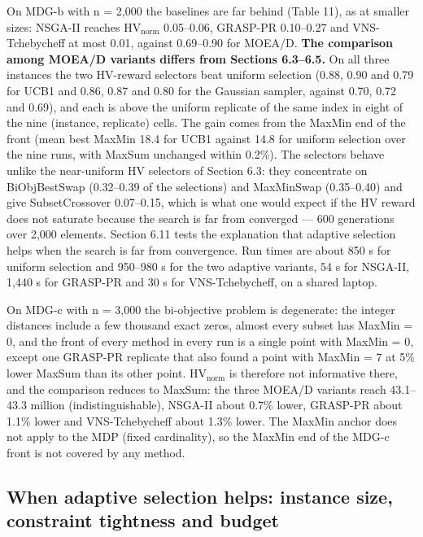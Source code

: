 On MDG-b with n = 2,000 the baselines are far behind (Table 11), as at smaller sizes: NSGA-II reaches $\mathrm{HV}_{\mathrm{norm}}$ 0.05--0.06, GRASP-PR 0.10--0.27 and VNS-Tchebycheff at most 0.01, against 0.69--0.90 for MOEA/D. \textbf{The comparison among MOEA/D variants differs from Sections 6.3--6.5.} On all three instances the two HV-reward selectors beat uniform selection (0.88, 0.90 and 0.79 for UCB1 and 0.86, 0.87 and 0.80 for the Gaussian sampler, against 0.70, 0.72 and 0.69), and each is above the uniform replicate of the same index in eight of the nine (instance, replicate) cells. The gain comes from the MaxMin end of the front (mean best MaxMin 18.4 for UCB1 against 14.8 for uniform selection over the nine runs, with MaxSum unchanged within 0.2\%). The selectors behave unlike the near-uniform HV selectors of Section 6.3: they concentrate on BiObjBestSwap (0.32--0.39 of the selections) and MaxMinSwap (0.35--0.40) and give SubsetCrossover 0.07--0.15, which is what one would expect if the HV reward does not saturate because the search is far from converged --- 600 generations over 2,000 elements. Section 6.11 tests the explanation that adaptive selection helps when the search is far from convergence. Run times are about 850 s for uniform selection and 950--980 s for the two adaptive variants, 54 s for NSGA-II, 1,440 s for GRASP-PR and 30 s for VNS-Tchebycheff, on a shared laptop.

On MDG-c with n = 3,000 the bi-objective problem is degenerate: the integer distances include a few thousand exact zeros, almost every subset has MaxMin = 0, and the front of every method in every run is a single point with MaxMin = 0, except one GRASP-PR replicate that also found a point with MaxMin = 7 at 5\% lower MaxSum than its other point. $\mathrm{HV}_{\mathrm{norm}}$ is therefore not informative there, and the comparison reduces to MaxSum: the three MOEA/D variants reach 43.1--43.3 million (indistinguishable), NSGA-II about 0.7\% lower, GRASP-PR about 1.1\% lower and VNS-Tchebycheff about 1.3\% lower. The MaxMin anchor does not apply to the MDP (fixed cardinality), so the MaxMin end of the MDG-c front is not covered by any method.


\subsection{When adaptive selection helps: instance size, constraint tightness and budget}\label{sec:when_adaptive_selection_help}

